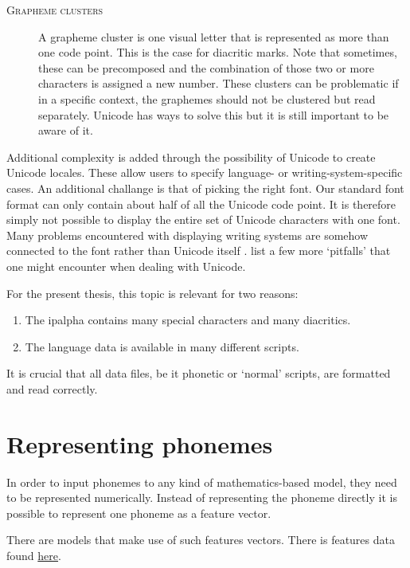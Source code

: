 \begin{description}
\item[\textsc{Grapheme clusters}] A grapheme cluster is one visual letter that is represented as more than one code point. This is the case for diacritic marks. Note that sometimes, these can be precomposed and the combination of those two or more characters is assigned a new number. These clusters can be problematic if in a specific context, the graphemes should not be clustered but read separately. Unicode has ways to solve this but it is still important to be aware of it.
\end{description} 

Additional complexity is added through the possibility of Unicode to create Unicode locales. These allow users to specify language- or writing-system-specific cases. An additional challange is that of picking the right font. Our standard font format can only contain about half of all the Unicode code point. It is therefore simply not possible to display the entire set of Unicode characters with one font. Many problems encountered with displaying writing systems are somehow connected to the font rather than Unicode itself \citep{unicode-lingu}. \citet{unicode-lingu} list a few more `pitfalls' that one might encounter when dealing with Unicode.

For the present thesis, this topic is relevant for two reasons: 
\begin{enumerate}
\item The \ac{ipalpha} contains many special characters and many diacritics.
\item The language data is available in many different scripts.
\end{enumerate} 

It is crucial that all data files, be it phonetic or `normal' scripts, are formatted and read correctly.

\section{Representing phonemes}
\label{phon-features}
In order to input phonemes to any kind of mathematics-based model, they need to be represented numerically. Instead of representing the phoneme directly it is possible to represent one phoneme as a feature vector. 

There are models that make use of such features vectors. There is features data found \href{https://github.com/uiuc-sst/g2ps}{here}.


